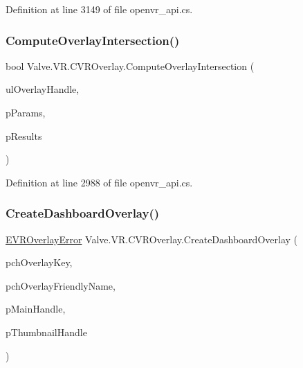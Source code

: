 Definition at line 3149 of file openvr\+\_\+api.\+cs.

\mbox{\label{class_valve_1_1_v_r_1_1_c_v_r_overlay_a1ce5f32391e533cd95c573152a2b0d1e}} 
\subsubsection{\texorpdfstring{ComputeOverlayIntersection()}{ComputeOverlayIntersection()}}
{\footnotesize\ttfamily bool Valve.\+V\+R.\+C\+V\+R\+Overlay.\+Compute\+Overlay\+Intersection (\begin{DoxyParamCaption}\item[{ulong}]{ul\+Overlay\+Handle,  }\item[{ref \mbox{\hyperlink{struct_valve_1_1_v_r_1_1_v_r_overlay_intersection_params__t}{V\+R\+Overlay\+Intersection\+Params\+\_\+t}}}]{p\+Params,  }\item[{ref \mbox{\hyperlink{struct_valve_1_1_v_r_1_1_v_r_overlay_intersection_results__t}{V\+R\+Overlay\+Intersection\+Results\+\_\+t}}}]{p\+Results }\end{DoxyParamCaption})}



Definition at line 2988 of file openvr\+\_\+api.\+cs.

\mbox{\label{class_valve_1_1_v_r_1_1_c_v_r_overlay_a3010fee626abfe4227ccbf2c53186508}} 
\subsubsection{\texorpdfstring{CreateDashboardOverlay()}{CreateDashboardOverlay()}}
{\footnotesize\ttfamily \mbox{\hyperlink{namespace_valve_1_1_v_r_aaee5c5144f42b7969d45b854f51b0c18}{E\+V\+R\+Overlay\+Error}} Valve.\+V\+R.\+C\+V\+R\+Overlay.\+Create\+Dashboard\+Overlay (\begin{DoxyParamCaption}\item[{string}]{pch\+Overlay\+Key,  }\item[{string}]{pch\+Overlay\+Friendly\+Name,  }\item[{ref ulong}]{p\+Main\+Handle,  }\item[{ref ulong}]{p\+Thumbnail\+Handle }\end{DoxyParamCaption})}



